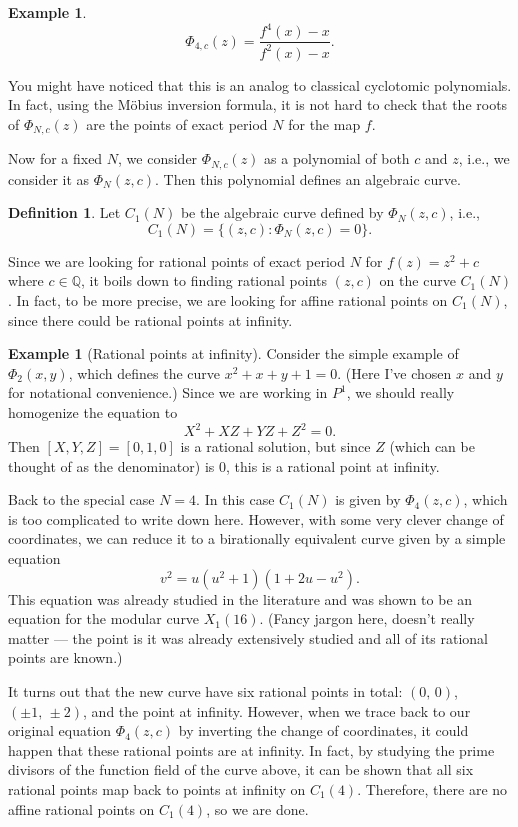 \documentclass{amsart}
\theoremstyle{plain}
\theoremstyle{definition}
\newtheorem{definition}[theorem]{Definition}
\newtheorem{example}[theorem]{Example}
\theoremstyle{remark}
\newcommand{\Q}{\mathbb{Q}}
\begin{document}
\begin{example}
  \[
  \Phi_{4, c}(z) = \frac{f^4(x) - x}{f^2(x) - x}.
  \]
\end{example}

You might have noticed that this is an analog to classical cyclotomic
polynomials. In fact, using the M\"obius inversion formula, it is not
hard to check that the roots of $\Phi_{N, c}(z)$ are the points of
exact period $N$ for the map $f$.

Now for a fixed $N$, we consider $\Phi_{N, c}(z)$ as a polynomial of
both $c$ and $z$, i.e., we consider it as $\Phi_N(z, c)$. Then this
polynomial defines an algebraic curve.

\begin{definition}
  Let $C_1(N)$ be the algebraic curve defined by $\Phi_N(z, c)$, i.e.,
  \[
  C_1(N) = \{(z, c) : \Phi_N(z, c) = 0\}.
  \]
\end{definition}

Since we are looking for rational points of exact period $N$ for $f(z)
= z^2 + c$ where $c \in \Q$, it boils down to finding rational points
$(z, c)$ on the curve $C_1(N)$. In fact, to be more precise, we are
looking for affine rational points on $C_1(N)$, since there could be
rational points at infinity.

\begin{example}[Rational points at infinity]
  Consider the simple example of $\Phi_2(x, y)$, which defines the
  curve $x^2 + x + y + 1 = 0$. (Here I've chosen $x$ and $y$ for
  notational convenience.) Since we are working in $P^1$, we should
  really homogenize the equation to
  \[
  X^2 + XZ + YZ + Z^2 = 0.
  \]
  Then $[X, Y, Z] = [0, 1, 0]$ is a rational solution, but since $Z$
  (which can be thought of as the denominator) is 0, this is a
  rational point at infinity.
\end{example}

Back to the special case $N = 4$. In this case $C_1(N)$ is given by
$\Phi_4(z, c)$, which is too complicated to write down here. However,
with some very clever change of coordinates, we can reduce it to a
birationally equivalent curve given by a simple equation
\[
v^2 = u(u^2 + 1)(1 + 2u - u^2).
\]
This equation was already studied in the literature and was shown to
be an equation for the modular curve $X_1(16)$. (Fancy jargon here,
doesn't really matter --- the point is it was already extensively
studied and all of its rational points are known.)

It turns out that the new curve have six rational points in total:
$(0,\, 0)$, $(\pm 1,\, \pm 2)$, and the point at infinity. However,
when we trace back to our original equation $\Phi_4(z, c)$ by
inverting the change of coordinates, it could happen that these
rational points are at infinity. In fact, by studying the prime
divisors of the function field of the curve above, it can be shown
that all six rational points map back to points at infinity on
$C_1(4)$. Therefore, there are no affine rational points on $C_1(4)$,
so we are done.
\end{document}
